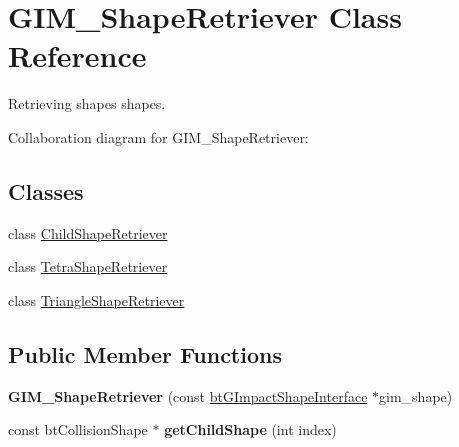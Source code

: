\hypertarget{class_g_i_m___shape_retriever}{\section{G\+I\+M\+\_\+\+Shape\+Retriever Class Reference}
\label{class_g_i_m___shape_retriever}
}


Retrieving shapes shapes.  




Collaboration diagram for G\+I\+M\+\_\+\+Shape\+Retriever\+:
\subsection*{Classes}
\begin{DoxyCompactItemize}
\item 
class \hyperlink{class_g_i_m___shape_retriever_1_1_child_shape_retriever}{Child\+Shape\+Retriever}
\item 
class \hyperlink{class_g_i_m___shape_retriever_1_1_tetra_shape_retriever}{Tetra\+Shape\+Retriever}
\item 
class \hyperlink{class_g_i_m___shape_retriever_1_1_triangle_shape_retriever}{Triangle\+Shape\+Retriever}
\end{DoxyCompactItemize}
\subsection*{Public Member Functions}
\begin{DoxyCompactItemize}
\item 
\hypertarget{class_g_i_m___shape_retriever_a1bf36a91ca47d07983c45c35cf398ebc}{{\bfseries G\+I\+M\+\_\+\+Shape\+Retriever} (const \hyperlink{classbt_g_impact_shape_interface}{bt\+G\+Impact\+Shape\+Interface} $\ast$gim\+\_\+shape)}\label{class_g_i_m___shape_retriever_a1bf36a91ca47d07983c45c35cf398ebc}

\item 
\hypertarget{class_g_i_m___shape_retriever_a83751e415bbb4c24f608ea786b7ddb6e}{const bt\+Collision\+Shape $\ast$ {\bfseries get\+Child\+Shape} (int index)}\label{class_g_i_m___shape_retriever_a83751e415bbb4c24f608ea786b7ddb6e}

\end{DoxyCompactItemize}
